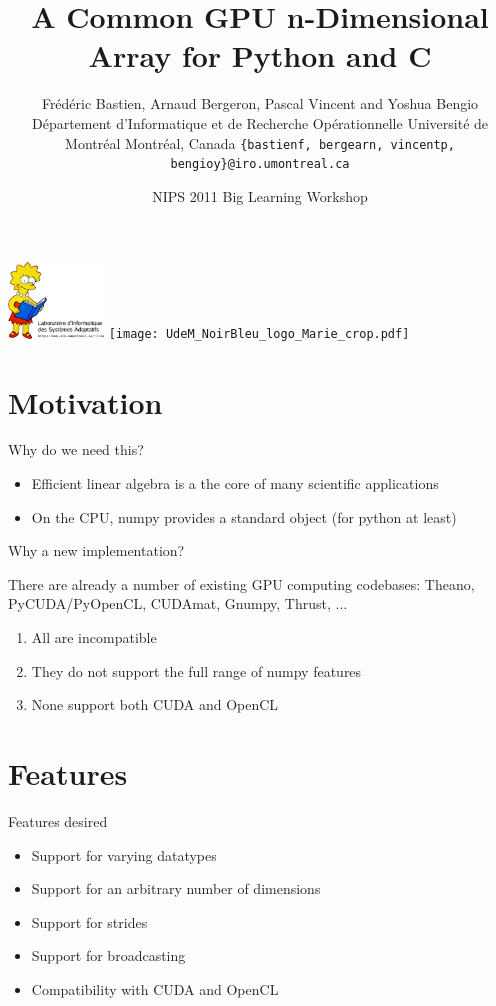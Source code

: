 \documentclass[utf8x,xcolor=pdftex,dvipsnames,table]{beamer}
\title{A Common GPU n-Dimensional Array for Python and C}
\author{
\footnotesize
Frédéric Bastien, Arnaud Bergeron, Pascal Vincent and Yoshua Bengio \newline
Département d'Informatique et de Recherche Opérationnelle \newline
Université de Montréal \newline
Montréal, Canada \newline
\texttt{\{bastienf, bergearn, vincentp, bengioy\}@iro.umontreal.ca}
}
\date{NIPS 2011 Big Learning Workshop}
\begin{document}
\begin{frame}[plain]
 \titlepage
 \includegraphics[width=1in]{lisabook_logo_text_3.png}
 \hfill
 \texttt{[image: UdeM\_NoirBleu\_logo\_Marie\_crop.pdf]}
\end{frame}
\addtocounter{framenumber}{-1}


\section{Motivation}

\begin{frame}{Why do we need this?}
\begin{itemize}
\item Efficient linear algebra is a the core of many scientific applications
\item On the CPU, numpy provides a standard object (for python at least)
\end{itemize}
\end{frame}

\begin{frame}{Why a new implementation?}
\begin{block}{There are already a number of existing GPU computing codebases:}
Theano, PyCUDA/PyOpenCL, CUDAmat, Gnumpy, Thrust, ...
\end {block}
\begin{enumerate}
\item<2-> All are incompatible
\item<3-> They do not support the full range of numpy features
\item<4-> None support both CUDA and OpenCL
\end{enumerate}
\end{frame}

\section{Features}
\begin{frame}{Features desired}
\begin{itemize}
\item Support for varying datatypes
\item Support for an arbitrary number of dimensions
\item Support for strides
\item Support for broadcasting
\item Compatibility with CUDA and OpenCL
\end{itemize}
\end{frame}
\end{document}

